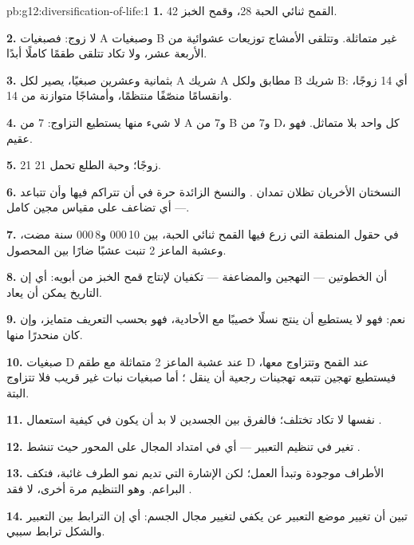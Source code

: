 \begin{solution}{pb:g12:diversification-of-life:1}
\textbf{1.} القمح ثنائي الحبة 28، وقمح الخبز 42.

\textbf{2.} لا زوج: فصبغيات A وصبغيات B غير متماثلة. وتتلقى الأمشاج
توزيعات عشوائية من الأربعة عشر، ولا تكاد تتلقى طقمًا كاملًا أبدًا.

\textbf{3.} بثمانية وعشرين صبغيًا، يصير لكل A شريك A مطابق ولكل B
شريك B: أي 14 زوجًا، وانقسامًا منصّفًا منتظمًا، وأمشاجًا متوازنة من 14.

\textbf{4.} لا شيء منها يستطيع التزاوج: 7 من A و7 من B و7 من D، كل
واحد بلا متماثل. فهو عقيم.

\textbf{5.} 21 زوجًا؛ وحبة الطلع تحمل 21.

\textbf{6.} النسختان الأخريان تظلان تمدان . والنسخ الزائدة
حرة في أن تتراكم فيها  وأن تتباعد --- أي تضاعف على مقياس مجين
كامل.

\textbf{7.} في حقول المنطقة التي زرع فيها القمح ثنائي الحبة، بين
10\,000 و8\,000 سنة مضت، وعشبة الماعز 2 تنبت عشبًا ضارًا بين المحصول.

\textbf{8.} أن الخطوتين --- التهجين والمضاعفة --- تكفيان لإنتاج قمح
الخبز من أبويه: أي إن التاريخ يمكن أن يعاد.

\textbf{9.} نعم: فهو لا يستطيع أن ينتج نسلًا خصيبًا مع الأحادية، فهو
بحسب التعريف  متمايز، وإن كان منحدرًا منها.

\textbf{10.} صبغيات D عند عشبة الماعز 2 متماثلة مع طقم D عند القمح
وتتزاوج معها، فيستطيع تهجين تتبعه تهجينات رجعية أن ينقل ؛ أما
صبغيات نبات غير قريب فلا تتزاوج البتة.

\textbf{11.}  نفسها لا تكاد تختلف؛ فالفرق بين الجسدين لا بد
أن يكون في كيفية استعمال .

\textbf{12.} تغير في تنظيم التعبير --- أي في امتداد المجال على المحور
حيث تنشط .

\textbf{13.}  الأطراف موجودة وتبدأ العمل؛ لكن الإشارة التي
تديم نمو الطرف غائبة، فتكف البراعم. وهو التنظيم مرة أخرى، لا فقد
.

\textbf{14.} تبين أن تغيير موضع التعبير عن  يكفي لتغيير مجال
الجسم: أي إن الترابط بين التعبير والشكل ترابط سببي.


\end{solution}

